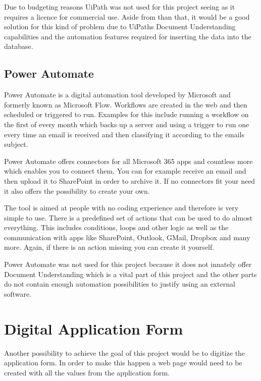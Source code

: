 \cite{UiPathOverview}
\cite{UiPathAcademyOverview}

Due to budgeting reasons UiPath was not used for this project seeing as it requires a licence for commercial use. Aside from than that, it would be a good solution for this kind of problem due to UiPaths Document Understanding capabilities and the automation features required for inserting the data into the database.

\subsection{Power Automate}

Power Automate is a digital automation tool developed by Microsoft and formerly known as Microsoft Flow. Workflows are created in the web and then scheduled or triggered to run. Examples for this include running a workflow on the first of every month which backs up a server and using a trigger to run one every time an email is received and then classifying it according to the emails subject.

Power Automate offers connectors for all Microsoft 365 apps and countless more which enables you to connect them. You can for example receive an email and then upload it to SharePoint in order to archive it. If no connectors fit your need it also offers the possibility to create your own.

The tool is aimed at people with no coding experience and therefore is very simple to use. There is a predefined set of actions that can be used to do almost everything. This includes conditions, loops and other logic as well as the communication with apps like SharePoint, Outlook, GMail, Dropbox and many more. Again, if there is an action missing you can create it yourself.

\cite{PowerAutomateOverview}

Power Automate was not used for this project because it does not innately offer Document Understanding which is a vital part of this project and the other parts            do not contain enough automation possibilities to justify using an external software.

\section{Digital Application Form}

Another possibility to achieve the goal of this project would be to digitize the application form. In order to make this happen a web page would need to be created with all the values from the application form.

